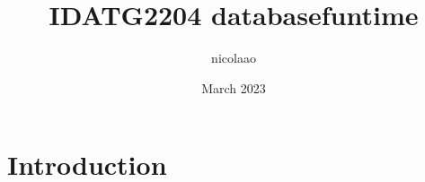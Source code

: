 \documentclass{article}
\title{IDATG2204 databasefuntime}
\author{nicolaao }
\date{March 2023}
\begin{document}
\maketitle

\section{Introduction}
\end{document}
